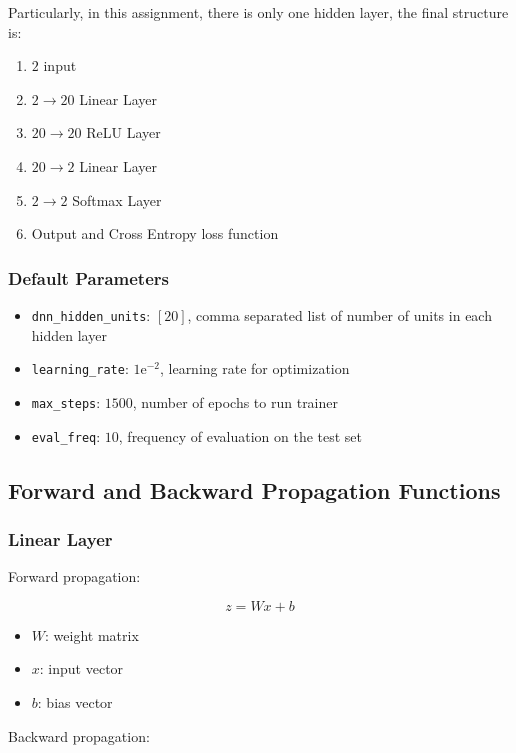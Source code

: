 Particularly, in this assignment, there is only one hidden layer, the final structure is:

\begin{enumerate}
  \item $2$ input
  \item $2 \rightarrow 20$ Linear Layer
  \item $20 \rightarrow 20$ ReLU Layer
  \item $20 \rightarrow 2$ Linear Layer
  \item $2 \rightarrow 2$ Softmax Layer
  \item Output and Cross Entropy loss function
\end{enumerate}

\subsubsection{Default Parameters}

\begin{itemize}
  \item \texttt{dnn\_hidden\_units}: $[20]$, comma separated list of number of units in each hidden layer
  \item \texttt{learning\_rate}: $1\mathrm{e}^{-2}$, learning rate for optimization
  \item \texttt{max\_steps}: $1500$, number of epochs to run trainer
  \item \texttt{eval\_freq}: $10$, frequency of evaluation on the test set
\end{itemize}

\subsection{Forward and Backward Propagation Functions}

\subsubsection{Linear Layer}

Forward propagation:

$$
z = Wx + b
$$

\begin{itemize}
  \item $W$: weight matrix
  \item $x$: input vector
  \item $b$: bias vector
\end{itemize}

Backward propagation:

